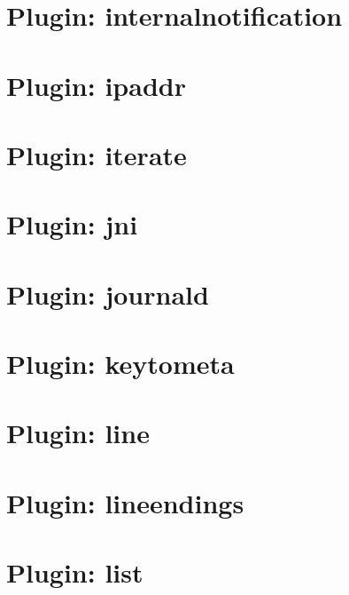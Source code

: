 \documentclass[twoside]{book}
\newcommand{\+}{\discretionary{\mbox{\scriptsize$\hookleftarrow$}}{}{}}
\begin{document}
\chapter{Plugin\+: internalnotification}
\label{md_src_plugins_internalnotification_README}

\chapter{Plugin\+: ipaddr}
\label{md_src_plugins_ipaddr_README}

\chapter{Plugin\+: iterate}
\label{md_src_plugins_iterate_README}

\chapter{Plugin\+: jni}
\label{md_src_plugins_jni_README}

\chapter{Plugin\+: journald}
\label{md_src_plugins_journald_README}

\chapter{Plugin\+: keytometa}
\label{md_src_plugins_keytometa_README}

\chapter{Plugin\+: line}
\label{md_src_plugins_line_README}

\chapter{Plugin\+: lineendings}
\label{md_src_plugins_lineendings_README}

\chapter{Plugin\+: list}
\label{md_src_plugins_list_README}

\end{document}
